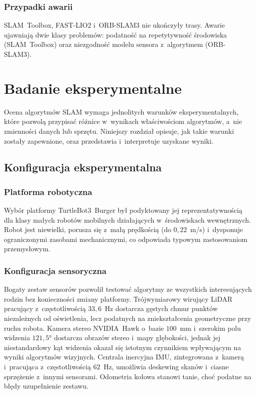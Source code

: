 \subsection{Przypadki awarii}

SLAM~Toolbox, FAST-LIO2 i~ORB-SLAM3 nie ukończyły trasy.
Awarie ujawniają dwie klasy problemów: podatność na repetytywność środowiska
(SLAM~Toolbox) oraz niezgodność modelu sensora z~algorytmem (ORB-SLAM3).



\chapter{Badanie eksperymentalne}

Ocena algorytmów SLAM wymaga jednolitych warunków eksperymentalnych,
które pozwolą przypisać różnice w~wynikach właściwościom algorytmów,
a~nie zmienności danych lub sprzętu.
Niniejszy rozdział opisuje, jak takie warunki zostały zapewnione,
oraz przedstawia i~interpretuje uzyskane wyniki.

\section{Konfiguracja eksperymentalna}

\subsection{Platforma robotyczna}

Wybór platformy TurtleBot3~Burger był podyktowany jej reprezentatywnością
dla klasy małych robotów mobilnych działających w~środowiskach wewnętrznych.
Robot jest niewielki, porusza się z~małą prędkością (do $0{,}22$~m/s)
i~dysponuje ograniczonymi zasobami mechanicznymi, co odpowiada typowym
zastosowaniom przemysłowym.

\subsection{Konfiguracja sensoryczna}

Bogaty zestaw sensorów pozwolił testować algorytmy ze wszystkich
interesujących rodzin bez konieczności zmiany platformy.
Trójwymiarowy wirujący LiDAR pracujący z~częstotliwością $33{,}6$~Hz dostarcza
gęstych chmur punktów niezależnych od oświetlenia, lecz podatnych na zniekształcenia
geometryczne przy ruchu robota.
Kamera stereo NVIDIA~Hawk o~bazie $100$~mm i~szerokim polu widzenia $121{,}5°$
dostarcza obrazów stereo i~mapy głębokości, jednak jej niestandardowy kąt
widzenia okazał się istotnym czynnikiem wpływającym na wyniki algorytmów
wizyjnych.
Centrala inercyjna IMU, zintegrowana z~kamerą i~pracująca z~częstotliwością
$62$~Hz, umożliwia deskewing skanów i~ciasne sprzężenie z~innymi sensorami.
Odometria kołowa stanowi tanie, choć podatne na błędy uzupełnienie zestawu.

